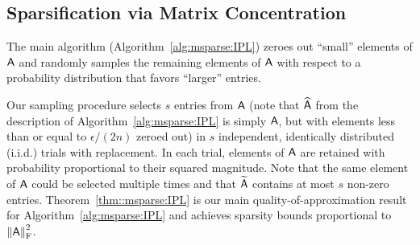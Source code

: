 \subsection{Sparsification via Matrix Concentration}\label{sec:msparse:conc}
%
The main algorithm (Algorithm~\ref{alg:msparse:IPL}) zeroes out ``small'' elements of ${\mathsf{A} }$ and randomly samples the remaining elements of ${\mathsf{A} }$ with respect to a probability distribution that favors ``larger'' entries.
%
%
Our sampling procedure selects $s$ entries from ${\mathsf{A} }$ (note that $\widehat{{\mathsf{A} }}$ from the description of Algorithm~\ref{alg:msparse:IPL} is simply ${\mathsf{A} }$, but with elements less than or equal to $\epsilon/(2n)$ zeroed out) in $s$ independent, identically distributed (i.i.d.) trials with replacement. In each trial, elements of ${\mathsf{A} }$ are retained with probability proportional to their squared magnitude. Note that the same element of ${\mathsf{A} }$ could be selected multiple times and that $\widetilde{{\mathsf{A} }}$ contains at most $s$ non-zero entries. Theorem~\ref{thm::msparse:IPL} is our main quality-of-approximation result for Algorithm~\ref{alg:msparse:IPL} and achieves sparsity bounds proportional to $\left\|{\mathsf{A} }\right\|_{\textrm{F}}^2$.
